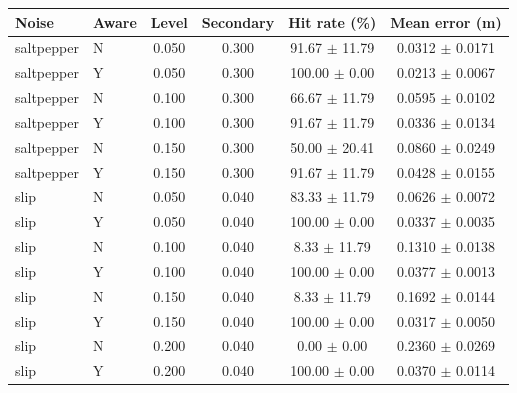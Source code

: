 \begin{tabular}{llcccc}
\hline
Noise & Aware & Level & Secondary & Hit rate (\%) & Mean error (m) \\
\hline
saltpepper & N & 0.050 & 0.300 & 91.67 $\pm$ 11.79 & 0.0312 $\pm$ 0.0171 \\
saltpepper & Y & 0.050 & 0.300 & 100.00 $\pm$ 0.00 & 0.0213 $\pm$ 0.0067 \\
saltpepper & N & 0.100 & 0.300 & 66.67 $\pm$ 11.79 & 0.0595 $\pm$ 0.0102 \\
saltpepper & Y & 0.100 & 0.300 & 91.67 $\pm$ 11.79 & 0.0336 $\pm$ 0.0134 \\
saltpepper & N & 0.150 & 0.300 & 50.00 $\pm$ 20.41 & 0.0860 $\pm$ 0.0249 \\
saltpepper & Y & 0.150 & 0.300 & 91.67 $\pm$ 11.79 & 0.0428 $\pm$ 0.0155 \\
slip & N & 0.050 & 0.040 & 83.33 $\pm$ 11.79 & 0.0626 $\pm$ 0.0072 \\
slip & Y & 0.050 & 0.040 & 100.00 $\pm$ 0.00 & 0.0337 $\pm$ 0.0035 \\
slip & N & 0.100 & 0.040 & 8.33 $\pm$ 11.79 & 0.1310 $\pm$ 0.0138 \\
slip & Y & 0.100 & 0.040 & 100.00 $\pm$ 0.00 & 0.0377 $\pm$ 0.0013 \\
slip & N & 0.150 & 0.040 & 8.33 $\pm$ 11.79 & 0.1692 $\pm$ 0.0144 \\
slip & Y & 0.150 & 0.040 & 100.00 $\pm$ 0.00 & 0.0317 $\pm$ 0.0050 \\
slip & N & 0.200 & 0.040 & 0.00 $\pm$ 0.00 & 0.2360 $\pm$ 0.0269 \\
slip & Y & 0.200 & 0.040 & 100.00 $\pm$ 0.00 & 0.0370 $\pm$ 0.0114 \\
\hline
\end{tabular}
